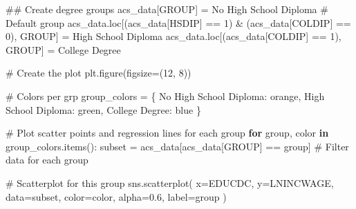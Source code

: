 \documentclass[
  11pt,
  letterpaper,
  DIV=11,
  numbers=noendperiod]{scrartcl}
\newenvironment{Shaded}{\begin{snugshade}}{\end{snugshade}}
\newcommand{\CommentTok}[1]{\textcolor[rgb]{0.37,0.37,0.37}{#1}}
\newcommand{\ControlFlowTok}[1]{\textcolor[rgb]{0.00,0.23,0.31}{\textbf{#1}}}
\newcommand{\DecValTok}[1]{\textcolor[rgb]{0.68,0.00,0.00}{#1}}
\newcommand{\FloatTok}[1]{\textcolor[rgb]{0.68,0.00,0.00}{#1}}
\newcommand{\KeywordTok}[1]{\textcolor[rgb]{0.00,0.23,0.31}{\textbf{#1}}}
\newcommand{\NormalTok}[1]{\textcolor[rgb]{0.00,0.23,0.31}{#1}}
\newcommand{\OperatorTok}[1]{\textcolor[rgb]{0.37,0.37,0.37}{#1}}
\newcommand{\StringTok}[1]{\textcolor[rgb]{0.13,0.47,0.30}{#1}}
\begin{document}
\begin{Shaded}
\begin{Highlighting}[]
\CommentTok{\#\# Create degree groups}
\NormalTok{acs\_data[}\StringTok{\textquotesingle{}GROUP\textquotesingle{}}\NormalTok{] }\OperatorTok{=} \StringTok{\textquotesingle{}No High School Diploma\textquotesingle{}}  \CommentTok{\# Default group}
\NormalTok{acs\_data.loc[(acs\_data[}\StringTok{\textquotesingle{}HSDIP\textquotesingle{}}\NormalTok{] }\OperatorTok{==} \DecValTok{1}\NormalTok{) }\OperatorTok{\&}\NormalTok{ (acs\_data[}\StringTok{\textquotesingle{}COLDIP\textquotesingle{}}\NormalTok{] }\OperatorTok{==} \DecValTok{0}\NormalTok{), }\StringTok{\textquotesingle{}GROUP\textquotesingle{}}\NormalTok{] }\OperatorTok{=} \StringTok{\textquotesingle{}High School Diploma\textquotesingle{}}
\NormalTok{acs\_data.loc[(acs\_data[}\StringTok{\textquotesingle{}COLDIP\textquotesingle{}}\NormalTok{] }\OperatorTok{==} \DecValTok{1}\NormalTok{), }\StringTok{\textquotesingle{}GROUP\textquotesingle{}}\NormalTok{] }\OperatorTok{=} \StringTok{\textquotesingle{}College Degree\textquotesingle{}}

\CommentTok{\# Create the plot}
\NormalTok{plt.figure(figsize}\OperatorTok{=}\NormalTok{(}\DecValTok{12}\NormalTok{, }\DecValTok{8}\NormalTok{))}

\CommentTok{\# Colors per grp}
\NormalTok{group\_colors }\OperatorTok{=}\NormalTok{ \{}
    \StringTok{\textquotesingle{}No High School Diploma\textquotesingle{}}\NormalTok{: }\StringTok{\textquotesingle{}orange\textquotesingle{}}\NormalTok{,}
    \StringTok{\textquotesingle{}High School Diploma\textquotesingle{}}\NormalTok{: }\StringTok{\textquotesingle{}green\textquotesingle{}}\NormalTok{,}
    \StringTok{\textquotesingle{}College Degree\textquotesingle{}}\NormalTok{: }\StringTok{\textquotesingle{}blue\textquotesingle{}}
\NormalTok{\}}

\CommentTok{\# Plot scatter points and regression lines for each group}
\ControlFlowTok{for}\NormalTok{ group, color }\KeywordTok{in}\NormalTok{ group\_colors.items():}
\NormalTok{    subset }\OperatorTok{=}\NormalTok{ acs\_data[acs\_data[}\StringTok{\textquotesingle{}GROUP\textquotesingle{}}\NormalTok{] }\OperatorTok{==}\NormalTok{ group]  }\CommentTok{\# Filter data for each group}
    
    \CommentTok{\# Scatterplot for this group}
\NormalTok{    sns.scatterplot(}
\NormalTok{        x}\OperatorTok{=}\StringTok{\textquotesingle{}EDUCDC\textquotesingle{}}\NormalTok{, }
\NormalTok{        y}\OperatorTok{=}\StringTok{\textquotesingle{}LNINCWAGE\textquotesingle{}}\NormalTok{,}
\NormalTok{        data}\OperatorTok{=}\NormalTok{subset, }
\NormalTok{        color}\OperatorTok{=}\NormalTok{color, }
\NormalTok{        alpha}\OperatorTok{=}\FloatTok{0.6}\NormalTok{, }
\NormalTok{        label}\OperatorTok{=}\NormalTok{group}
\NormalTok{    )}
    

\end{Highlighting}
\end{Shaded}
\end{document}
